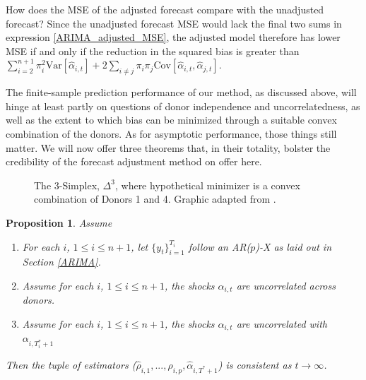 \documentclass{uiucthesis2021}
\newtheorem{prop}{Proposition}
\theoremstyle{definition}
\begin{document}
  How does the MSE of the adjusted forecast compare with the unadjusted forecast?  Since the unadjusted forecast MSE would lack the final two sums in expression \ref{ARIMA_adjusted_MSE}, the adjusted model therefore has lower MSE if and only if the reduction in the squared bias is greater than $\sum_{i=2}^{n+1}\pi_{i}^{2}\text{Var}[\hat\alpha_{i,t}] + 2\sum_{i\neq j}\pi_{i}\pi_{j}\text{Cov}[\hat\alpha_{i,t},\hat\alpha_{j,t}]$.
  
  The finite-sample prediction performance of our method, as discussed above, will hinge at least partly on questions of donor independence and uncorrelatedness, as well as the extent to which bias can be minimized through a suitable convex combination of the donors.  As for asymptotic performance, those things still matter.  We will now offer three theorems that, in their totality, bolster the credibility of the forecast adjustment method on offer here.
  
  \begin{figure}
  \centering
  \caption{The 3-Simplex, $\Delta^{3}$, where hypothetical minimizer is a convex combination of Donors 1 and 4.  Graphic adapted from \cite[][]{tetrahedron}.}
  \end{figure}
   
  \begin{prop}\label{ARIMA_param_consistency}
  Assume
    \begin{enumerate}
      \item For each $i$, $1\leq i \leq n + 1$, let $\{y_{t}\}^{T_{i}}_{i=1}$ follow an AR($p$)-X as laid out in Section \ref{ARIMA}.
      \item Assume for each $i$, $1\leq i \leq n + 1$, the shocks $\alpha_{i,t}$ are uncorrelated across donors.
      \item Assume for each $i$, $1\leq i \leq n + 1$, the shocks $\alpha_{i,t}$ are uncorrelated with $\alpha_{i,T_{i}^{*}+1}$ 
     \end{enumerate}
  
  Then the tuple of estimators ($\hat\rho_{i,1},...,\hat\rho_{i, p}, \hat\alpha_{i,T^{*}+1}$) is consistent as $t \rightarrow \infty$.
  \end{prop}
  
\end{document}
